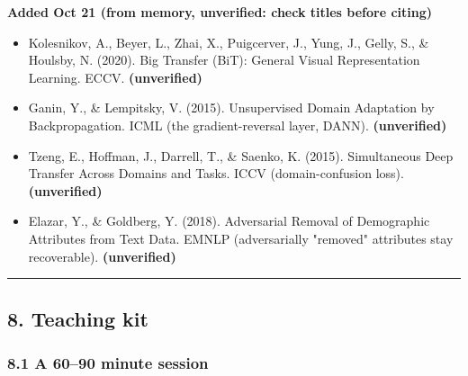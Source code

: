 \documentclass[
  11pt,
]{article}
\providecommand{\tightlist}{%
  \setlength{\itemsep}{0pt}\setlength{\parskip}{0pt}}
\renewcommand{\_}{\oldunderscore\allowbreak}
\begin{document}
\textbf{Added Oct 21 (from memory,
unverified: check titles before citing)}

\begin{itemize}
\tightlist
\item
  Kolesnikov, A., Beyer, L., Zhai, X.,
  Puigcerver, J., Yung, J., Gelly, S.,
  \& Houlsby, N. (2020). Big Transfer
  (BiT): General Visual Representation
  Learning. ECCV. \textbf{(unverified)}
\item
  Ganin, Y., \& Lempitsky, V. (2015).
  Unsupervised Domain Adaptation by
  Backpropagation. ICML (the
  gradient-reversal layer, DANN).
  \textbf{(unverified)}
\item
  Tzeng, E., Hoffman, J., Darrell, T.,
  \& Saenko, K. (2015). Simultaneous
  Deep Transfer Across Domains and
  Tasks. ICCV (domain-confusion loss).
  \textbf{(unverified)}
\item
  Elazar, Y., \& Goldberg, Y. (2018).
  Adversarial Removal of Demographic
  Attributes from Text Data. EMNLP
  (adversarially "removed" attributes
  stay recoverable).
  \textbf{(unverified)}
\end{itemize}

\begin{center}\rule{0.5\linewidth}{0.5pt}\end{center}

\subsection{8. Teaching
kit}\label{teaching-kit}

\subsubsection{8.1 A 60--90 minute
session}\label{a-6090-minute-session}
\end{document}
